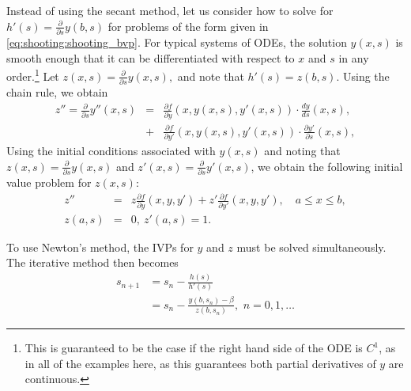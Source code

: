Instead of using the secant method, let us consider how to solve for $h'(s)=\frac{\partial }{\partial s} y(b,s)$ for problems of the form given in \eqref{eq:shooting:shooting_bvp}.
For typical systems of ODEs, the solution $y(x,s)$ is smooth enough that it can be differentiated with respect to $x$ and $s$ in any order.\footnote{This is guaranteed to be the case if the right hand side of the ODE is \(C^1\), as in all of the examples here, as this guarantees both partial derivatives of \(y\) are continuous.} %
Let $z(x,s) = \frac{\partial }{\partial s} y(x,s),$ and note that \(h'(s)=z(b,s)\).
Using the chain rule, we obtain
\begin{eqnarray*}
z'' = \frac{\partial }{\partial s} y''(x,s) &=& \frac{\partial f}{\partial y} (x,y(x,s),y'(x,s)) \cdot \frac{dy}{ds}(x,s) ,\\
&+& \frac{\partial f}{\partial y'} (x,y(x,s),y'(x,s)) \cdot \frac{\partial y'}{\partial s}(x,s),
\end{eqnarray*}
Using the initial conditions associated with $y(x,s)$ and noting that $z(x, s) = \frac{\partial }{\partial s}y(x, s)$ and $z'(x, s) = \frac{\partial }{\partial s}y'(x, s)$, we obtain the following initial value problem for $z(x,s)$:
\begin{eqnarray*}
z'' &=& z\frac{\partial f}{\partial y} (x,y,y') + z' \frac{\partial f}{\partial y'} (x,y,y')
,\quad a \leq x \leq b, \\
 z(a, s) &=& 0,\ z'(a, s) = 1.
\end{eqnarray*}

To use Newton's method, the IVPs for $y$ and $z$ must be solved simultaneously.
The iterative method then becomes
\begin{align}
s_{n+1} &= s_n-\frac{h(s)}{h'(s)}\nonumber
\\
&=s_n - \frac{ y(b,s_n) - \beta}{z(b,s_n)}, \,\, n = 0,1,\hdots \label{eq:shooting:newtonmethod}
\end{align}

